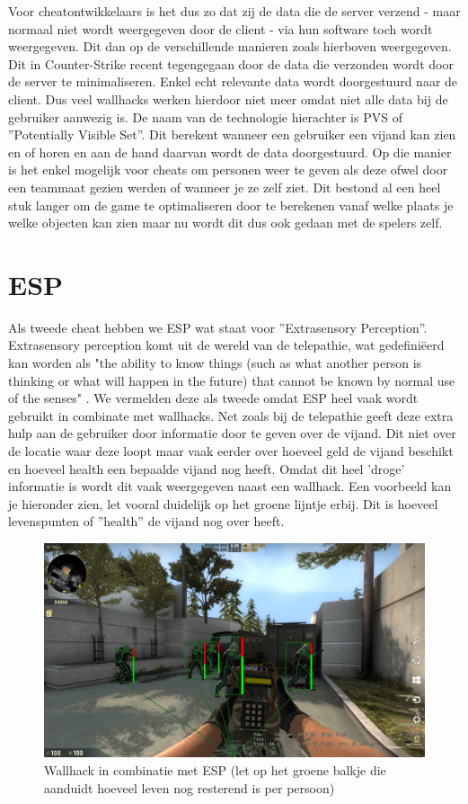 \documentclass[pdftex,a4paper,12pt,twoside]{report}
\begin{document}
Voor cheatontwikkelaars is het dus zo dat zij de data die de server verzend - maar normaal niet wordt weergegeven door de client - via hun software toch wordt weergegeven. Dit dan op de verschillende manieren zoals hierboven weergegeven.
\\

Dit in Counter-Strike recent tegengegaan door de data die verzonden wordt door de server te minimaliseren. Enkel echt relevante data wordt doorgestuurd naar de client. Dus veel wallhacks werken hierdoor niet meer omdat niet alle data bij de gebruiker aanwezig is. De naam van de technologie hierachter is PVS of ''Potentially Visible Set''. Dit berekent wanneer een gebruiker een vijand kan zien en of horen en aan de hand daarvan wordt de data doorgestuurd. Op die manier is het enkel mogelijk voor cheats om personen weer te geven als deze ofwel door een teammaat gezien werden of wanneer je ze zelf ziet. Dit bestond al een heel stuk langer om de game te optimaliseren door te berekenen vanaf welke plaats je welke objecten kan zien maar nu wordt dit dus ook gedaan met de spelers zelf. 
\citep{PVS}

\section{ESP}
\label{ESP}
Als tweede cheat hebben we ESP wat staat voor ''Extrasensory Perception''. Extrasensory perception komt uit de wereld van de telepathie, wat gedefiniëerd kan worden als "the ability to know things (such as what another person is thinking or what will happen in the future) that cannot be known by normal use of the senses" \citep{extrasensoryperception}. We vermelden deze als tweede omdat ESP heel vaak wordt gebruikt in combinate met wallhacks. Net zoals bij de telepathie geeft deze extra hulp aan de gebruiker door informatie door te geven over de vijand. Dit niet over de locatie waar deze loopt maar vaak eerder over hoeveel geld de vijand beschikt en hoeveel health een bepaalde vijand nog heeft.
Omdat dit heel 'droge' informatie is wordt dit vaak weergegeven naast een wallhack. Een voorbeeld kan je hieronder zien, let vooral duidelijk op het groene lijntje erbij. Dit is hoeveel levenspunten of ''health'' de vijand nog over heeft.
\begin{figure}[!hb]
\centering
\includegraphics[width=15cm]{img/esp-example}
\caption{Wallhack in combinatie met ESP (let op het groene balkje die aanduidt hoeveel leven nog resterend is per persoon)}
\end{figure}
  
\end{document}
